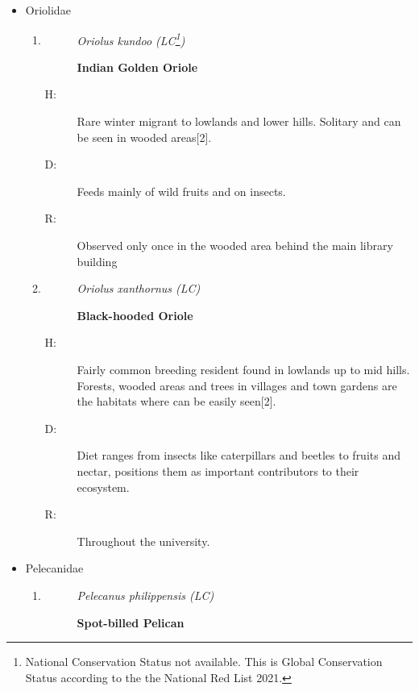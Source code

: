 \begin{itemize}
\begin{enumerate}
\begin{description}
\end{description}%
\end{enumerate}%
\item%
Oriolidae%
\begin{enumerate}%
\item%
\begin{description}%
\item[]%
\textit{Oriolus kundoo (LC\footnote{National Conservation Status not available. This is Global Conservation Status according to the the National Red List 2021.})}%
\item[]%
\textbf{Indian Golden Oriole}%
\end{description}%
\begin{description}%
\item[H: ]%
Rare winter migrant to lowlands and lower hills. Solitary and can be seen in wooded areas{[}2{]}.%
\item[D: ]%
Feeds mainly of wild fruits and on insects. %
\item[R: ]%
Observed only once in the wooded area behind the main library building%
\end{description}%
\item%
\begin{description}%
\item[]%
\textit{Oriolus xanthornus (LC)}%
\item[]%
\textbf{Black{-}hooded Oriole}%
\end{description}%
\begin{description}%
\item[H: ]%
Fairly common breeding resident found in lowlands up to mid hills. Forests, wooded areas and trees in villages and town gardens are the habitats where can be easily seen{[}2{]}.%
\item[D: ]%
Diet ranges from insects like caterpillars and beetles to fruits and nectar, positions them as important contributors to their ecosystem.%
\item[R: ]%
Throughout the university.%
\end{description}%
\end{enumerate}%
\item%
Pelecanidae%
\begin{enumerate}%
\item%
\begin{description}%
\item[]%
\textit{Pelecanus philippensis (LC)}%
\item[]%
\textbf{Spot{-}billed Pelican}%
\end{description}%

\end{enumerate}
\end{itemize}
